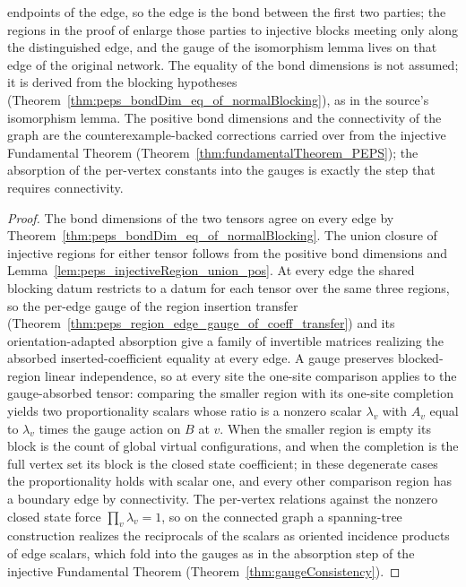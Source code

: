 \begin{theorem}
    endpoints of the edge, so the edge is the bond between the first two
    parties; the regions in the proof of
    \cite[Theorem~3]{Molnar2018NormalPEPS} enlarge those parties to injective
    blocks meeting only along the distinguished edge, and the gauge of the
    isomorphism lemma lives on that edge of the original network. The
    equality of the bond dimensions is not assumed; it is derived from the
    blocking hypotheses
    (Theorem~\ref{thm:peps_bondDim_eq_of_normalBlocking}), as in the source's
    isomorphism lemma. The
    positive bond dimensions and the connectivity of the graph are the
    counterexample-backed corrections carried over from the injective
    Fundamental Theorem (Theorem~\ref{thm:fundamentalTheorem_PEPS}); the
    absorption of the per-vertex constants into the gauges is exactly the step
    that requires connectivity.
    \begin{proof}
        \leanok
        The bond dimensions of the two tensors agree on every edge by
        Theorem~\ref{thm:peps_bondDim_eq_of_normalBlocking}.
        The union closure of injective regions for either tensor follows from
        the positive bond dimensions and
        Lemma~\ref{lem:peps_injectiveRegion_union_pos}.  At every edge the
        shared blocking datum restricts to a datum for each tensor over the
        same three regions, so the per-edge gauge of the region insertion
        transfer (Theorem~\ref{thm:peps_region_edge_gauge_of_coeff_transfer})
        and its orientation-adapted absorption give a family of invertible
        matrices realizing the absorbed inserted-coefficient equality at every
        edge.  A gauge preserves blocked-region linear independence, so at
        every site the one-site comparison applies to the gauge-absorbed
        tensor: comparing the smaller region with its one-site completion
        yields two proportionality scalars whose ratio is a nonzero scalar
        $\lambda_v$ with $A_v$ equal to $\lambda_v$ times the gauge action on
        $B$ at $v$.  When the smaller region is empty its block is the count
        of global virtual configurations, and when the completion is the full
        vertex set its block is the closed state coefficient; in these
        degenerate cases the proportionality holds with scalar one, and every
        other comparison region has a boundary edge by connectivity.  The
        per-vertex relations against the nonzero closed state force
        $\prod_v \lambda_v = 1$, so on the connected graph a spanning-tree
        construction realizes the reciprocals of the scalars as oriented
        incidence products of edge scalars, which fold into the gauges as in
        the absorption step of the injective Fundamental Theorem
        (Theorem~\ref{thm:gaugeConsistency}).
    \end{proof}
\end{theorem}

